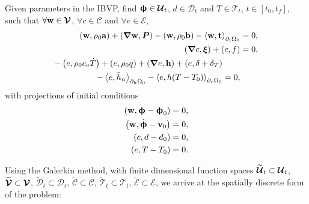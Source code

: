 \begin{mdframed}[
    frametitle={The weak form},
    frametitlebackgroundcolor=gray!20,
    backgroundcolor=gray!5,
    linewidth=0pt,
    nobreak=true
  ]
  Given parameters in the IBVP, find $\boldsymbol{\upphi} \in \boldsymbol{\mathcal{U}}_t$, $d \in \mathcal{D}_t$ and $T \in \mathcal{T}_t$, $t \in [t_0, t_f]$, such that $\forall \textbf{w} \in \boldsymbol{\mathcal{V}}$, $\forall c \in \mathcal{C}$ and $\forall e \in \mathcal{E}$,
  \begin{subequations}
    \begin{align}
      \left( \textbf{w}, \rho_0\textbf{a} \right) + \left( \boldsymbol{\nabla} \textbf{w}, \boldsymbol{P} \right) - \left( \textbf{w}, \rho_0 \textbf{b} \right) - \left< \textbf{w}, \textbf{t} \right>_{\partial_t\Omega_0} & = 0, \\
      \left( \boldsymbol{\nabla} c, \boldsymbol{\xi} \right) + \left( c, f \right)                                                                                               & = 0, \\
      \begin{split}
        - \left( e, \rho_0c_v\dot{T} \right) + \left( e, \rho_0q \right) + \left( \boldsymbol{\nabla} e, \textbf{h} \right) + \left( e, \delta+\delta_T \right)& \\
        - \left< e, \bar{h}_n \right>_{\partial_h\Omega_0} - \left< e, h(T-T_0) \right>_{\partial_r\Omega_0} &= 0,
      \end{split}
    \end{align}
  \end{subequations}
  with projections of initial conditions
  \begin{subequations}
    \begin{align}
      \left( \textbf{w}, \boldsymbol{\upphi} - \boldsymbol{\upphi}_0 \right) & = 0, \\
      \left( \textbf{w}, \dot{\boldsymbol{\upphi}} - \textbf{v}_0 \right)           & = 0, \\
      \left( c, d - d_0 \right)                        & = 0, \\
      \left( e, T - T_0 \right)                        & = 0. 
    \end{align}
  \end{subequations}
\end{mdframed}
Using the Galerkin method, with finite dimensional function spaces $\widetilde{\boldsymbol{\mathcal{U}}}_t \subset \boldsymbol{\mathcal{U}}_t$, $\widetilde{\boldsymbol{\mathcal{V}}} \subset \boldsymbol{\mathcal{V}}$, $\widetilde{\mathcal{D}}_t \subset \mathcal{D}_t$, $\widetilde{\mathcal{C}} \subset \mathcal{C}$, $\widetilde{\mathcal{T}}_t \subset \mathcal{T}_t$, $\widetilde{\mathcal{E}} \subset \mathcal{E}$, we arrive at the spatially discrete form of the problem:
